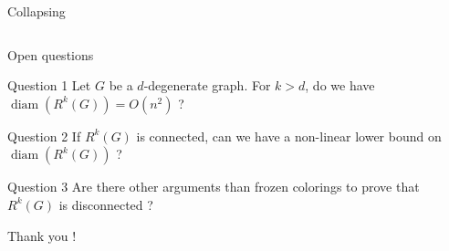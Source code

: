 \documentclass[11pt,xcolor=dvipsnames,presentation,aspectratio=169]{beamer}
\newcommand{\backupbegin}{
   \newcounter{finalframe}
   \setcounter{finalframe}{\value{framenumber}}
}
\newcommand{\backupend}{
   \setcounter{framenumber}{\value{finalframe}}
}
\DeclareMathOperator{\diam}{diam}
\begin{document}
\begin{frame}{Collapsing}
\begin{columns}
\begin{column}{.35\linewidth}
    \end{column}
    \hfill
  \end{columns}
\end{frame}

\begin{frame}{Open questions}
  \begin{alertblock}{Question 1}
    Let $G$ be a $d$-degenerate graph. For $k > d$, do we have
    $\diam(R^k(G)) = O(n^2)$ ?
  \end{alertblock}

  \begin{alertblock}{Question 2}
    If $R^k(G)$ is connected, can we have a non-linear lower bound on
    $\diam(R^k(G))$ ?
  \end{alertblock}

  \begin{alertblock}{Question 3}
    Are there other arguments than frozen colorings to prove that $R^k(G)$ is
    disconnected ?
  \end{alertblock}
  \vspace{1cm}
  \centering
  Thank you !
\end{frame}

\backupbegin
\backupend
\end{document}
